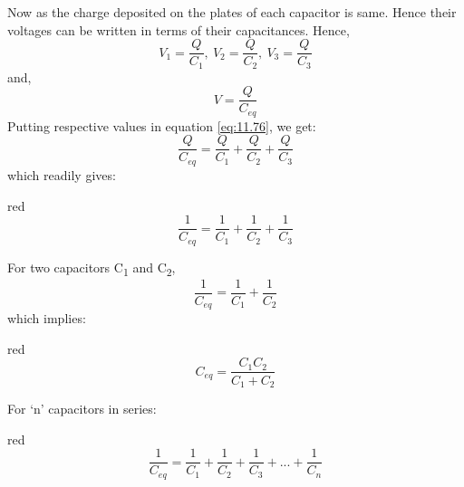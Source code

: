 Now as the charge deposited on the plates of each capacitor is same.
Hence their voltages can be written in terms of their capacitances.
Hence,
\begin{equation}\nonumber
  V_{1} = \frac{Q}{C_{1}},\:V_{2} = \frac{Q}{C_2},\: V_{3} = \frac{Q}{C_{3}}
\end{equation}
and, 
\begin{equation}\nonumber
  V =  \frac{Q}{C_{eq}}
\end{equation}
Putting respective values in equation \ref{eq:11.76}, we get:
\begin{equation}\nonumber
  \frac{Q}{C_{eq}} = \frac{Q}{C_{1}} + \frac{Q}{C_2} + \frac{Q}{C_{3}}
\end{equation}
which readily gives:
\begin{mybox}{red}{}
\begin{equation}\label{eq:11.79}
  \frac{1}{C_{eq}} = \frac{1}{C_{1}} + \frac{1}{C_2} + \frac{1}{C_{3}}
\end{equation}
\end{mybox}
\noindent For two capacitors C\textsubscript{1} and C\textsubscript{2}, 
\begin{equation}\nonumber
  \frac{1}{C_{eq}} = \frac{1}{C_{1}} + \frac{1}{C_2}
\end{equation}
which implies:
\begin{mybox}{red}{}
\begin{equation}\label{eq:11.80}
  C_{eq} = \frac{C_{1}C_{2}}{C_{1}+C_{2}}
\end{equation}
\end{mybox}
\noindent For `n' capacitors in series:
\begin{mybox}{red}{}
\begin{equation}\label{eq:11.81}
  \frac{1}{C_{eq}} = \frac{1}{C_{1}} + \frac{1}{C_2} + \frac{1}{C_{3}} +...+\frac{1}{C_{n}}
\end{equation}
\end{mybox}
